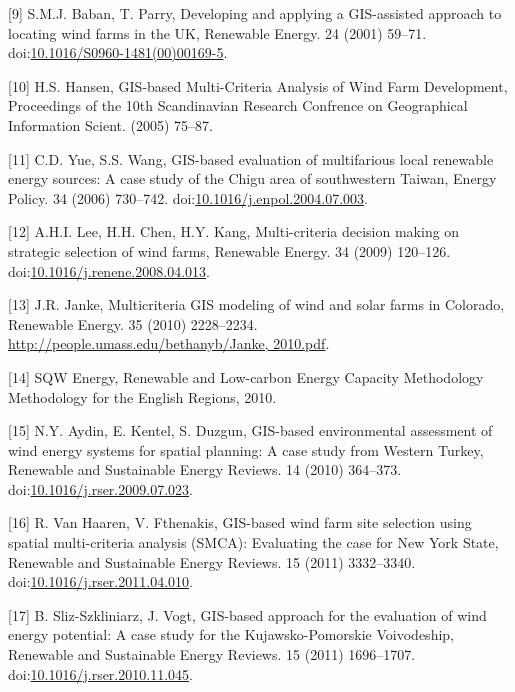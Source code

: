 \documentclass[a4paper,]{article}
\theoremstyle{definition}
\theoremstyle{definition}
\theoremstyle{definition}
\theoremstyle{remark}
\begin{document}
\hypertarget{ref-Baban2001}{}
{[}9{]} S.M.J. Baban, T. Parry, Developing and applying a GIS-assisted
approach to locating wind farms in the UK, Renewable Energy. 24 (2001)
59--71.
doi:\href{https://doi.org/10.1016/S0960-1481(00)00169-5}{10.1016/S0960-1481(00)00169-5}.

\hypertarget{ref-Hansen2005}{}
{[}10{]} H.S. Hansen, GIS-based Multi-Criteria Analysis of Wind Farm
Development, Proceedings of the 10th Scandinavian Research Confrence on
Geographical Information Scient. (2005) 75--87.

\hypertarget{ref-Yue2006}{}
{[}11{]} C.D. Yue, S.S. Wang, GIS-based evaluation of multifarious local
renewable energy sources: A case study of the Chigu area of southwestern
Taiwan, Energy Policy. 34 (2006) 730--742.
doi:\href{https://doi.org/10.1016/j.enpol.2004.07.003}{10.1016/j.enpol.2004.07.003}.

\hypertarget{ref-Lee2009}{}
{[}12{]} A.H.I. Lee, H.H. Chen, H.Y. Kang, Multi-criteria decision
making on strategic selection of wind farms, Renewable Energy. 34 (2009)
120--126.
doi:\href{https://doi.org/10.1016/j.renene.2008.04.013}{10.1016/j.renene.2008.04.013}.

\hypertarget{ref-Janke2010}{}
{[}13{]} J.R. Janke, Multicriteria GIS modeling of wind and solar farms
in Colorado, Renewable Energy. 35 (2010) 2228--2234.
\href{http://people.umass.edu/bethanyb/Janke,\%202010.pdf}{http://people.umass.edu/bethanyb/Janke, 2010.pdf}.

\hypertarget{ref-SQWEnergy2010}{}
{[}14{]} SQW Energy, Renewable and Low-carbon Energy Capacity
Methodology Methodology for the English Regions, 2010.

\hypertarget{ref-Aydin2010}{}
{[}15{]} N.Y. Aydin, E. Kentel, S. Duzgun, GIS-based environmental
assessment of wind energy systems for spatial planning: A case study
from Western Turkey, Renewable and Sustainable Energy Reviews. 14 (2010)
364--373.
doi:\href{https://doi.org/10.1016/j.rser.2009.07.023}{10.1016/j.rser.2009.07.023}.

\hypertarget{ref-VanHaaren2011}{}
{[}16{]} R. Van Haaren, V. Fthenakis, GIS-based wind farm site selection
using spatial multi-criteria analysis (SMCA): Evaluating the case for
New York State, Renewable and Sustainable Energy Reviews. 15 (2011)
3332--3340.
doi:\href{https://doi.org/10.1016/j.rser.2011.04.010}{10.1016/j.rser.2011.04.010}.

\hypertarget{ref-Sliz-Szkliniarz2011}{}
{[}17{]} B. Sliz-Szkliniarz, J. Vogt, GIS-based approach for the
evaluation of wind energy potential: A case study for the
Kujawsko-Pomorskie Voivodeship, Renewable and Sustainable Energy
Reviews. 15 (2011) 1696--1707.
doi:\href{https://doi.org/10.1016/j.rser.2010.11.045}{10.1016/j.rser.2010.11.045}.
\end{document}
